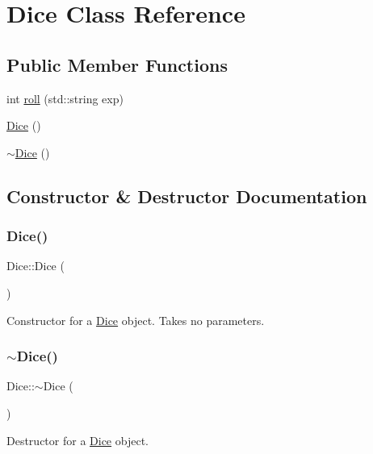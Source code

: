 \hypertarget{class_dice}{}\section{Dice Class Reference}
\label{class_dice}
\subsection*{Public Member Functions}
\begin{DoxyCompactItemize}
\item 
int \hyperlink{class_dice_a0bc8f4b697804af0785f34b801cd6feb}{roll} (std\+::string exp)
\item 
\hyperlink{class_dice_a6b9eadd945ad8fd3840379c8824e5d48}{Dice} ()
\item 
\hyperlink{class_dice_a48e90392d2ff1e6736c88f22e8a87751}{$\sim$\+Dice} ()
\end{DoxyCompactItemize}


\subsection{Constructor \& Destructor Documentation}
\hypertarget{class_dice_a6b9eadd945ad8fd3840379c8824e5d48}{}\label{class_dice_a6b9eadd945ad8fd3840379c8824e5d48} 
\subsubsection{\texorpdfstring{Dice()}{Dice()}}
{\footnotesize\ttfamily Dice\+::\+Dice (\begin{DoxyParamCaption}{ }\end{DoxyParamCaption})}

Constructor for a \hyperlink{class_dice}{Dice} object. Takes no parameters. \hypertarget{class_dice_a48e90392d2ff1e6736c88f22e8a87751}{}\label{class_dice_a48e90392d2ff1e6736c88f22e8a87751} 
\subsubsection{\texorpdfstring{$\sim$\+Dice()}{~Dice()}}
{\footnotesize\ttfamily Dice\+::$\sim$\+Dice (\begin{DoxyParamCaption}{ }\end{DoxyParamCaption})}

Destructor for a \hyperlink{class_dice}{Dice} object. 

